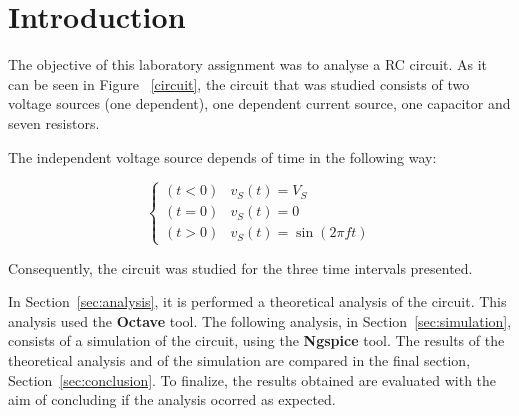 \section{Introduction}
\label{sec:introduction}

The objective of this laboratory assignment was to analyse a RC circuit. As it can be seen in Figure ~\ref{circuit}, the circuit that was studied consists of two voltage sources (one dependent), one dependent current source, one capacitor and seven resistors.

The independent voltage source depends of time in the following way:

\begin{equation}
  \begin{cases}
    (t < 0) & v_S(t) = V_S \\
    (t = 0) & v_S(t) = 0 \\
    (t > 0) & v_S(t) = \sin(2\pi ft)
  \end{cases}
\end{equation}

Consequently, the circuit was studied for the three time intervals presented.

In Section~\ref{sec:analysis}, it is performed a theoretical analysis of the circuit. This analysis used the {\bf Octave} tool. The following analysis, in Section~\ref{sec:simulation}, consists of a simulation of the circuit, using the {\bf Ngspice} tool. The results of the theoretical analysis and of the simulation are compared in the final section, Section~\ref{sec:conclusion}. To finalize, the results obtained are evaluated with the aim of concluding if the analysis ocorred as expected.





